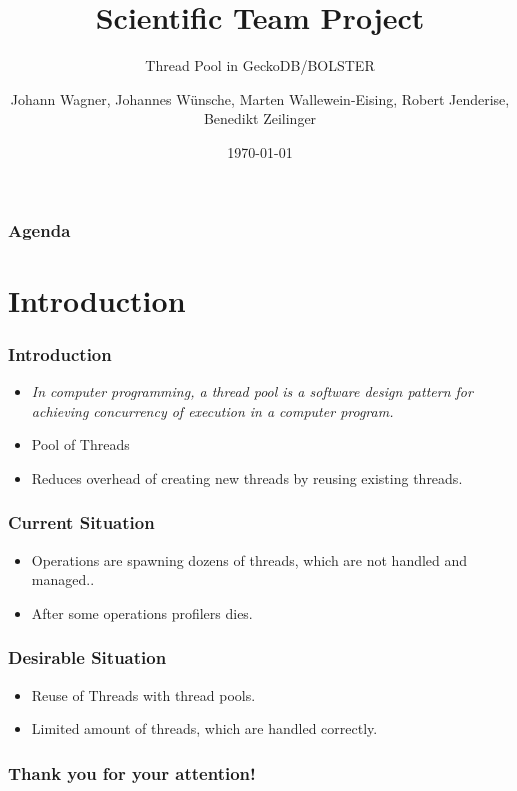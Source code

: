 \documentclass{beamer}
\title{Scientific Team Project}
\subtitle{Thread Pool in GeckoDB/BOLSTER}
\author{Johann Wagner, Johannes Wünsche, Marten Wallewein-Eising, Robert Jenderise, Benedikt Zeilinger}
\date{\today}
\institute{Otto von Guericke University, Magdeburg}
\begin{document}
\begin{frame}[plain]
 \titlepage
\end{frame}



\section[Agenda]{}
	\begin{frame}
	\frametitle{Agenda}
	\tableofcontents
	\end{frame}

\section{Introduction}
	\begin{frame}
		\frametitle{Introduction}
		\begin{itemize}
			\item \emph{In computer programming, a thread pool is a software design pattern for achieving concurrency of execution in a computer program.}
			\item Pool of Threads
			\item Reduces overhead of creating new threads by reusing existing threads.
		\end{itemize}
	\end{frame}
	\begin{frame}
		\frametitle{Current Situation}
		\begin{itemize}
			\item Operations are spawning dozens of threads, which are not handled and managed..
			\item After some operations profilers dies.
		\end{itemize}
	\end{frame}
	
	\begin{frame}
		\frametitle{Desirable Situation}
		\begin{itemize}
			\item Reuse of Threads with thread pools.
			\item Limited amount of threads, which are handled correctly.
		\end{itemize}
	\end{frame}

\begin{frame}
 \frametitle{Thank you for your attention!}
\end{frame}
\end{document}
